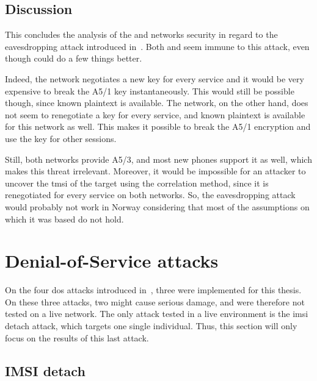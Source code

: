     \subsection{Discussion}

      This concludes the analysis of the  and
       networks security in regard to the eavesdropping
      attack introduced in~. Both
       and  seem immune to this attack, even
      though  could do a few things better.

      Indeed, the  network negotiates a new key for every
      service and it would be very expensive to break the A5/1 key
      instantaneously. This would still be possible though, since known
      plaintext is available. The  network, on the other
      hand, does not seem to renegotiate a key for every service, and
      known plaintext is available for this network as well. This makes
      it possible to break the A5/1 encryption and use the key for other
      sessions.

      Still, both networks provide A5/3, and most new phones support it
      as well, which makes this threat irrelevant. Moreover, it would be
      impossible for an attacker to uncover the \gls{tmsi} of the target
      using the correlation method, since it is renegotiated for every
      service on both networks. So, the eavesdropping attack would
      probably not work in Norway considering that most of the
      assumptions on which it was based do not hold.

  \section{Denial-of-Service attacks}

    On the four \gls{dos} attacks introduced in~,
    three were implemented for this thesis. On these three attacks, two
    might cause serious damage, and were therefore not tested on a live
    network. The only attack tested in a live environment is the
    \gls{imsi} detach attack, which targets one single individual. Thus,
    this section will only focus on the results of this last attack.

    \subsection{IMSI detach}

